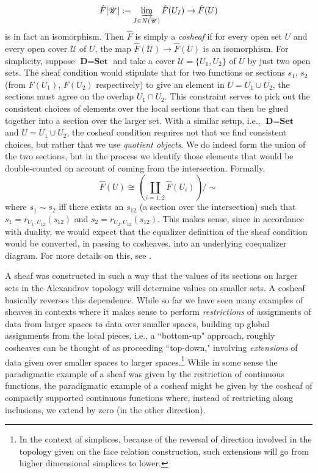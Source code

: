 \documentclass[11pt]{book}
\theoremstyle{definition}
\theoremstyle{definition}
\theoremstyle{definition}
\theoremstyle{theorem}
\theoremstyle{definition}
\begin{document}
{	\begin{equation}
	\hat{F}[\mathscr{U}] := \varinjlim_{I \in N(\mathscr{U})} \hat{F}(U_I) \rightarrow \hat{F}(U)
	\end{equation} 
	is in fact an isomorphism. Then $\hat{F}$ is simply a \textit{cosheaf} if for every open set $U$ and every open cover $\mathscr{U}$ of $U$, the map $\hat{F}(\mathscr{U}) \rightarrow \hat{F}(U)$ is an isomorphism. For simplicity, suppose $\textbf{D} = \textbf{Set}$ and take a cover $\mathscr{U} = \{U_1, U_2\}$ of $U$ by just two open sets. The sheaf condition would stipulate that for two functions or sections $s_1$, $s_2$ (from $F(U_1)$, $F(U_2)$ respectively) to give an element in $U = U_1 \cup U_2$, the sections must agree on the overlap $U_1 \cap U_2$. This constraint serves to pick out the consistent choices of elements over the local sections that can then be glued together into a section over the larger set. With a similar setup, i.e., $\textbf{D} = \textbf{Set}$ and $U = U_1 \cup U_2$, the cosheaf condition requires not that we find consistent choices, but rather that we use \textit{quotient objects}. We do indeed form the union of the two sections, but in the process we identify those elements that would be double-counted on account of coming from the intersection. Formally, 
	\begin{equation}
	\hat{F}(U) \cong (\coprod_{i = 1,2} \hat{F}(U_i)) / \sim 
	\end{equation}
	where $s_1 \sim s_2$ iff there exists an $s_{12}$ (a section over the intersection) such that $s_1 = r_{U_1, U_{12}}(s_{12})$ and $s_2 = r_{U_2, U_{12}}(s_{12})$. This makes sense, since in accordance with duality, we would expect that the equalizer definition of the sheaf condition would be converted, in passing to cosheaves, into an underlying coequalizer diagram. For more details on this, see \cite{curry_sheaves_2013}.} 
	\par 
A sheaf was constructed in such a way that the values of its sections on larger sets in the Alexandrov topology will determine values on smaller sets. A cosheaf basically reverses this dependence. While so far we have seen many examples of sheaves in contexts where it makes sense to perform \textit{restrictions} of assignments of data from larger spaces to data over smaller spaces, building up global assignments from the local pieces, i.e., a ``bottom-up" approach, roughly cosheaves can be thought of as proceeding ``top-down," involving \textit{extensions} of data given over smaller spaces to larger spaces.\footnote{In the context of simplices, because of the reversal of direction involved in the topology given on the face relation construction, such extensions will go from higher dimensional simplices to lower.} While in some sense the paradigmatic example of a sheaf was given by the restriction of continuous functions, the paradigmatic example of a cosheaf might be given by the cosheaf of compactly supported continuous functions where, instead of restricting along inclusions, we extend by zero (in the other direction).\par 
\end{document}
